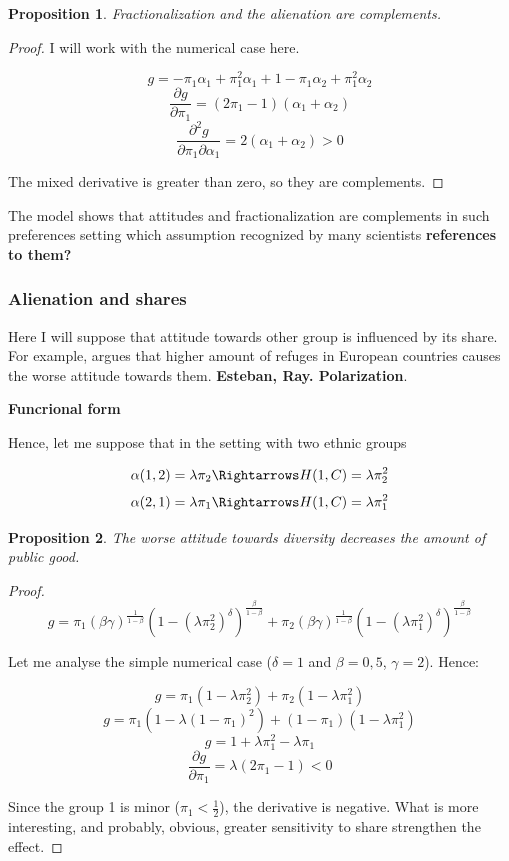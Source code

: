 \documentclass[letterpaper,11pt]{article}
\newtheorem{proposition}{Proposition}
\begin{document}
\begin{proposition}
    Fractionalization and the alienation are complements.
\end{proposition}

\begin{proof}
    I will work with the numerical case here.
    
    \[ g =  - \pi_1\alpha_1 + \pi_1^2\alpha_1 + 1 -  \pi_1 \alpha_2 + \pi_1^2 \alpha_2  \]
    \[\frac{\partial g}{ \partial \pi_1} =  (2\pi_1 - 1)(\alpha_1 + \alpha_2)  \]
    \[\frac{\partial^2 g}{ \partial \pi_1 \partial \alpha_1} =  2(\alpha_1 + \alpha_2) > 0 \]
    
    The mixed derivative is greater than zero, so they are complements.
\end{proof}

The model shows that attitudes and fractionalization are complements in such preferences setting which assumption recognized by many scientists \textbf{references to them?} 

\subsubsection{Alienation and shares}

Here I will suppose that attitude towards other group is influenced by its share. For example, \cite{Refuges} argues that higher amount of refuges in European countries causes the worse attitude towards them. \textbf{Esteban, Ray. Polarization}.

\textbf{Funcrional form}

Hence, let me suppose that in the setting with two ethnic groups

\[ \alpha(1,2) = \lambda \pi_2 \Rightarrows H(1,C) = \lambda \pi_2^2 \]
\[ \alpha(2,1) = \lambda \pi_1 \Rightarrows H(1,C) = \lambda \pi_1^2  \]
\begin{proposition}
    The worse attitude towards diversity decreases the amount of public good.
\end{proposition}

\begin{proof}

\[ g = \pi_1 (\beta\gamma )^\frac{1}{1 - \beta} (1 - (\lambda \pi_2^2)^\delta)^\frac{\beta}{1 - \beta}   + \pi_2 (\beta\gamma )^\frac{1}{1 - \beta} (1 - (\lambda \pi_1^2)^\delta)^\frac{\beta}{1 - \beta}  \]

Let me analyse the simple numerical case ($\delta = 1$ and $\beta = 0,5$, $\gamma = 2$). Hence:

\[ g = \pi_1 (1 - \lambda \pi_2^2) + \pi_2 (1 - \lambda \pi_1^2) \]
\[ g = \pi_1 (1 - \lambda (1 - \pi_1)^2) + (1 - \pi_1) (1 - \lambda \pi_1^2) \]
\[g = 1 + \lambda \pi_1^2 - \lambda \pi_1 \]
\[ \frac{\partial g}{\partial \pi_1} = \lambda (2\pi_1 - 1) < 0 \]

Since the group 1 is minor ($\pi_1 < \frac{1}{2}$), the derivative is negative. What is more interesting, and probably, obvious, greater sensitivity to share strengthen the effect.

\end{proof}
\end{document}
